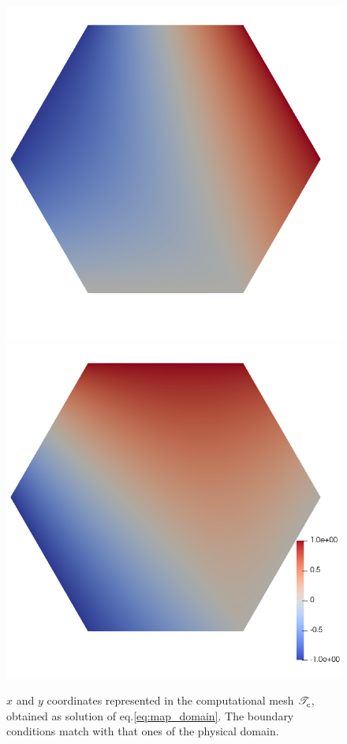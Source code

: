 \documentclass[a4paper,11pt]{article}
\begin{document}
{\begin{figure}[h!]
    \centering
    \includegraphics[scale=0.2]{Images/Test1/r-adaptive/xc.png}
    \includegraphics[scale=0.2]{Images/Test1/r-adaptive/yc.png}
    \caption{ $x$ and $y$ coordinates represented in the computational mesh $\mathscr T^{}_{c}$, obtained as solution of eq.\eqref{eq:map_domain}. The boundary conditions match with that ones of the physical domain.}
    \label{fig:x,y_comp}
\end{figure}
 
}
\end{document}
